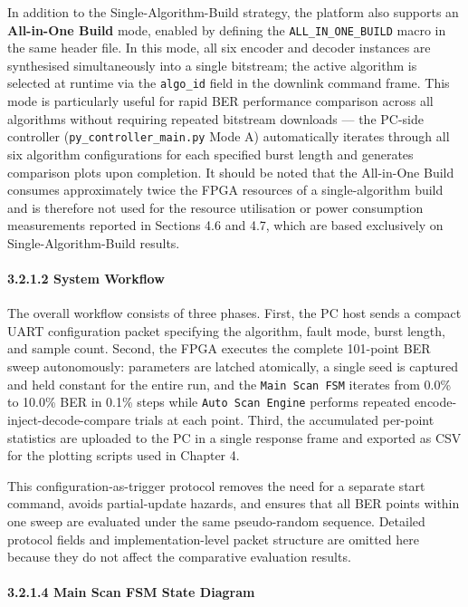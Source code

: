 In addition to the Single-Algorithm-Build strategy, the platform also
supports an \textbf{All-in-One Build} mode, enabled by defining the
\texttt{ALL\_IN\_ONE\_BUILD} macro in the same header file. In this
mode, all six encoder and decoder instances are synthesised
simultaneously into a single bitstream; the active algorithm is selected
at runtime via the \texttt{algo\_id} field in the downlink command
frame. This mode is particularly useful for rapid BER performance
comparison across all algorithms without requiring repeated bitstream
downloads --- the PC-side controller (\texttt{py\_controller\_main.py}
Mode A) automatically iterates through all six algorithm configurations
for each specified burst length and generates comparison plots upon
completion. It should be noted that the All-in-One Build consumes
approximately twice the FPGA resources of a single-algorithm build and
is therefore not used for the resource utilisation or power consumption
measurements reported in Sections 4.6 and 4.7, which are based
exclusively on Single-Algorithm-Build results.

\paragraph{3.2.1.2 System Workflow}\label{system-workflow}

The overall workflow consists of three phases. First, the PC host sends
a compact UART configuration packet specifying the algorithm, fault
mode, burst length, and sample count. Second, the FPGA executes the
complete 101-point BER sweep autonomously: parameters are latched
atomically, a single seed is captured and held constant for the entire
run, and the \texttt{Main\ Scan\ FSM} iterates from 0.0\% to 10.0\% BER
in 0.1\% steps while \texttt{Auto\ Scan\ Engine} performs repeated
encode-inject-decode-compare trials at each point. Third, the
accumulated per-point statistics are uploaded to the PC in a single
response frame and exported as CSV for the plotting scripts used in
Chapter 4.

This configuration-as-trigger protocol removes the need for a separate
start command, avoids partial-update hazards, and ensures that all BER
points within one sweep are evaluated under the same pseudo-random
sequence. Detailed protocol fields and implementation-level packet
structure are omitted here because they do not affect the comparative
evaluation results.

\paragraph{3.2.1.4 Main Scan FSM State
Diagram}\label{main-scan-fsm-state-diagram}

